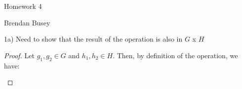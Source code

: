 \documentclass[executivepaper]{article}
\begin{document}
\begin{center}

Homework 4

\end{center}

\begin{flushright}

Brendan Busey

\end{flushright}

\begin{flushleft}


1a) Need to show that the result of the operation is also in $G$ x $H$

\begin{proof}

Let $g_{1}, g_{2} \in G$ and $h_{1}, h_{2} \in H$. Then, by definition of the operation, we have:

\begin{center}



\end{center}

\end{proof}

\end{flushleft}
\end{document}
